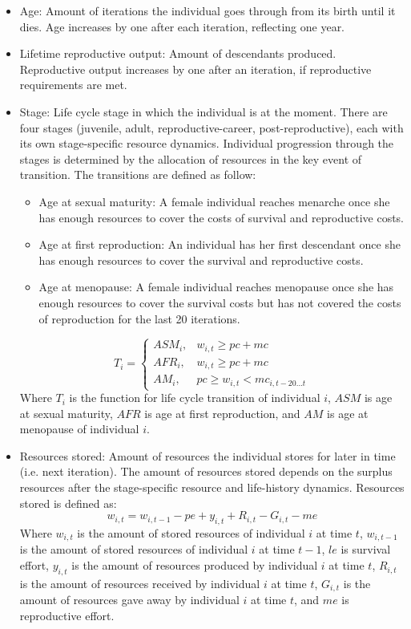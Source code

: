 \documentclass{article}
\begin{document}
    \begin{itemize}
        \item Age: Amount of iterations the individual goes through from its birth until it dies. Age increases by one after each iteration, reflecting one year.
        \item Lifetime reproductive output: Amount of descendants produced. Reproductive output increases by one after an iteration, if reproductive requirements are met.
        \item Stage: Life cycle stage in which the individual is at the moment. There are four stages (juvenile, adult, reproductive-career, post-reproductive), each with its own stage-specific resource dynamics. Individual progression through the stages is determined by the allocation of resources in the key event of transition. The transitions are defined as follow:
        \begin{itemize}
            \item Age at sexual maturity: A female individual reaches menarche once she has enough resources to cover the costs of survival and reproductive costs.
            \item Age at first reproduction: An individual has her first descendant once she has enough resources to cover the survival and reproductive costs.
            \item Age at menopause: A female individual reaches menopause once she has enough resources to cover the survival costs but has not covered the costs of reproduction for the last 20 iterations. 
        \end{itemize}
\begin{equation}
    T_i=\begin{cases}
    ASM_i,& w_{i,t} \geq pc+mc\\
    AFR_i,& w_{i,t} \geq pc+mc\\
    AM_i,& pc \geq w_{i,t} < mc_{i,t-20...t}
\end{cases}
\end{equation}
        Where $T_i$ is the function for life cycle transition of individual $i$, $ASM$ is age at sexual maturity, $AFR$ is age at first reproduction, and $AM$ is age at menopause of individual $i$.
        \item Resources stored: Amount of resources the individual stores for later in time (i.e. next iteration). The amount of resources stored depends on the surplus resources after the stage-specific resource and life-history dynamics. Resources stored is defined as:
\begin{equation}
    w_{i,t}=w_{i,t-1} - pe + y_{i,t} + R_{i,t} - G_{i,t} - me
\end{equation}
    Where $w_{i,t}$ is the amount of stored resources of individual $i$ at time $t$, $w_{i,t-1}$ is the amount of stored resources of individual $i$ at time $t-1$, $le$ is survival effort, $y_{i,t}$ is the amount of resources produced by individual $i$ at time $t$, $R_{i,t}$ is the amount of resources received by individual $i$ at time $t$, $G_{i,t}$ is the amount of resources gave away by individual $i$ at time $t$, and $me$ is reproductive effort.
    \end{itemize}
\end{document}
